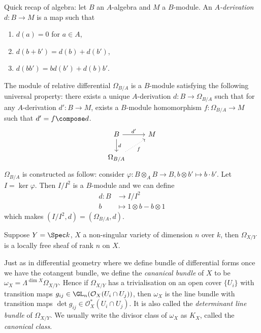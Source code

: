 \documentclass[a4paper]{article}
\newcommand{\sh}[1]{\mathcal{#1}} %
\begin{document}
Quick recap of algebra: let \(B\) an \(A\)-algebra and \(M\) a \(B\)-module. An \emph{\(A\)-derivation} \(d: B \to M\) is a map such that
\begin{enumerate}
\item \(d(a) = 0\) for \(a \in A\),
\item \(d(b + b') = d(b) + d(b')\),
\item \(d(bb') = b d(b') + d(b) b'\).
\end{enumerate}
The module of relative differential \(\Omega_{B/A}\) is a \(B\)-module satisfying the following universal property: there exists a unique \(A\)-derivation \(d: B \to \Omega_{B/A}\) such that for any \(A\)-derivation \(d': B \to M\), exists a \(B\)-module homomorphism \(f: \Omega_{B/A} \to M\) such that \(d' = f \compose d\).
\[
  \begin{tikzcd}
    B \ar[r, "d'"] \ar[d, "d"] & M \\
    \Omega_{B/A} \ar[ur, dotted, "f"']
  \end{tikzcd}
\]
\(\Omega_{B/A}\) is constructed as follow: consider \(\varphi: B \otimes_A B \to B, b \otimes b' \mapsto b \cdot b'\). Let \(I = \ker \varphi\). Then \(I/I^2\) is a \(B\)-module and we can define
\begin{align*}
  d: B &\to I/I^2 \\
  b &\mapsto 1 \otimes b - b \otimes 1
\end{align*}
which makes \((I/I^2, d) = (\Omega_{B/A}, d)\).

\begin{eg}
  Suppose \(Y = \Spec k\), \(X\) a non-singular variety of dimension \(n\) over \(k\), then \(\Omega_{X/Y}\) is a locally free sheaf of rank \(n\) on \(X\).
\end{eg}

Just as in differential geometry where we define bundle of differential forms once we have the cotangent bundle, we define the \emph{cananical bundle} of \(X\) to be \(\omega_X = \Lambda^{\dim X} \Omega_{X/Y}\). Hence if \(\Omega_{X/Y}\) has a trivialisation on an open cover \(\{U_i\}\) with transition maps \(g_{ij} \in \GL_n(\sh O_X(U_i \cap U_j))\), then \(\omega_X\) is the line bundle with transition maps \(\det g_{ij} \in \sh O_X^*(U_i \cap U_j)\). It is also called the \emph{determinant line bundle} of \(\Omega_{X/Y}\). We usually write the divisor class of \(\omega_X\) as \(K_X\), called the \emph{canonical class}.
\end{document}
